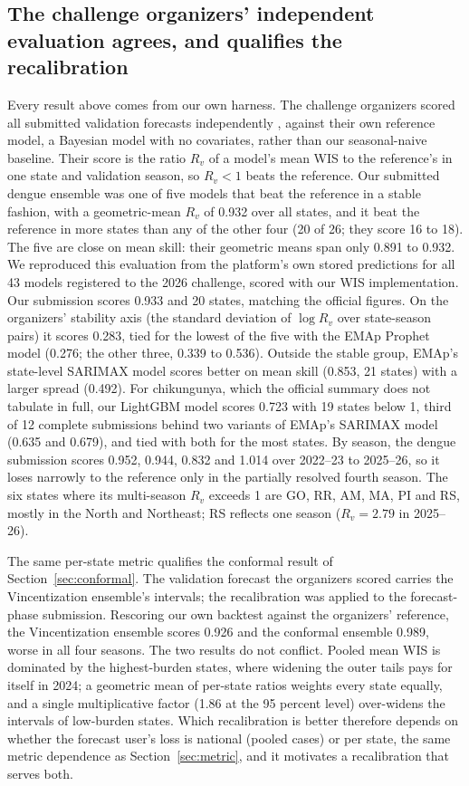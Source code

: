 \documentclass[11pt]{article}
\begin{document}
\subsection{The challenge organizers' independent evaluation agrees, and qualifies the
recalibration}\label{sec:official}
Every result above comes from our own harness. The challenge organizers scored all submitted
validation forecasts independently \citep{imdc2026results}, against their own reference model, a
Bayesian model with no covariates, rather than our seasonal-naive baseline. Their score is the ratio
$R_v$ of a model's mean WIS to the reference's in one state and validation season, so $R_v<1$ beats
the reference. Our submitted dengue ensemble was one of five models that beat the reference in a
stable fashion, with a geometric-mean $R_v$ of 0.932 over all states, and it beat the reference in
more states than any of the other four (20 of 26; they score 16 to 18). The five are close on mean
skill: their geometric means span only 0.891 to 0.932. We reproduced this evaluation from the
platform's own stored predictions for all 43 models registered to the 2026 challenge, scored with our
WIS implementation. Our submission scores 0.933 and 20 states, matching the official figures. On the
organizers' stability axis (the standard deviation of $\log R_v$ over state-season pairs) it scores
0.283, tied for the lowest of the five with the EMAp Prophet model (0.276; the other three, 0.339 to
0.536). Outside the stable group, EMAp's state-level SARIMAX model scores better on mean skill
(0.853, 21 states) with a larger spread (0.492). For chikungunya, which the official summary does
not tabulate in full, our LightGBM model scores 0.723 with 19 states below 1, third of 12 complete
submissions behind two variants of EMAp's SARIMAX model (0.635 and 0.679), and tied with both for
the most states. By season, the dengue submission scores 0.952, 0.944, 0.832 and
1.014 over 2022--23 to 2025--26, so it loses narrowly to the reference only in the partially resolved
fourth season. The six states where its multi-season $R_v$ exceeds 1 are GO, RR, AM, MA, PI and RS,
mostly in the North and Northeast; RS reflects one season ($R_v=2.79$ in 2025--26).

The same per-state metric qualifies the conformal result of Section~\ref{sec:conformal}. The
validation forecast the organizers scored carries the Vincentization ensemble's intervals; the
recalibration was applied to the forecast-phase submission. Rescoring our own backtest against the
organizers' reference, the Vincentization ensemble scores 0.926 and the conformal ensemble 0.989,
worse in all four seasons. The two results do not conflict. Pooled mean WIS is dominated by the
highest-burden states, where widening the outer tails pays for itself in 2024; a geometric mean of
per-state ratios weights every state equally, and a single multiplicative factor (1.86 at the 95
percent level) over-widens the intervals of low-burden states. Which recalibration is better
therefore depends on whether the forecast user's loss is national (pooled cases) or per state, the
same metric dependence as Section~\ref{sec:metric}, and it motivates a recalibration that serves
both.
\end{document}
